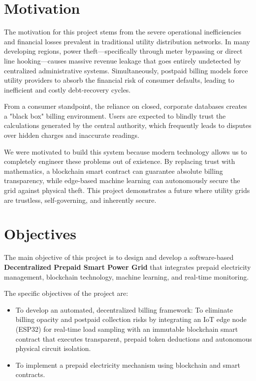 \section{Motivation}

The motivation for this project stems from the severe operational inefficiencies and financial losses prevalent in traditional utility distribution networks. In many developing regions, power theft—specifically through meter bypassing or direct line hooking—causes massive revenue leakage that goes entirely undetected by centralized administrative systems. Simultaneously, postpaid billing models force utility providers to absorb the financial risk of consumer defaults, leading to inefficient and costly debt-recovery cycles.

From a consumer standpoint, the reliance on closed, corporate databases creates a "black box" billing environment. Users are expected to blindly trust the calculations generated by the central authority, which frequently leads to disputes over hidden charges and inaccurate readings.

We were motivated to build this system because modern technology allows us to completely engineer these problems out of existence. By replacing trust with mathematics, a blockchain smart contract can guarantee absolute billing transparency, while edge-based machine learning can autonomously secure the grid against physical theft. This project demonstrates a future where utility grids are trustless, self-governing, and inherently secure.

\section{Objectives}

The main objective of this project is to design and develop a software-based \textbf{Decentralized Prepaid Smart Power Grid} that integrates prepaid electricity management, blockchain technology, machine learning, and real-time monitoring.

The specific objectives of the project are:

\begin{itemize}
\item To develop an automated, decentralized billing framework: To eliminate billing opacity and postpaid collection risks by integrating an IoT edge node (ESP32) for real-time load sampling with an immutable blockchain smart contract that executes transparent, prepaid token deductions and autonomous physical circuit isolation.

\item To implement a prepaid electricity mechanism using blockchain and smart contracts.
\end{itemize}

